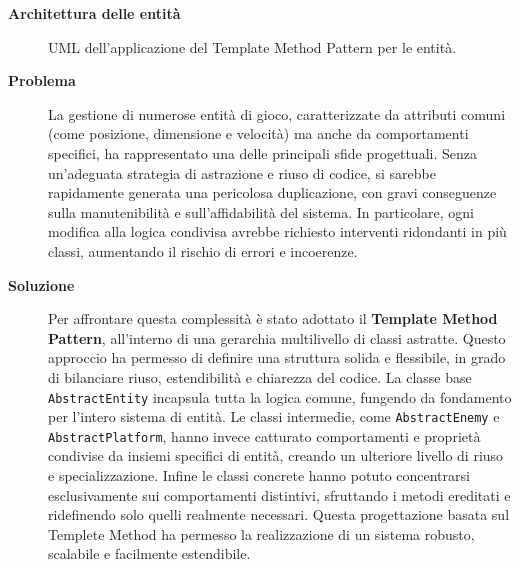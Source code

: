 \documentclass[a4paper,12pt]{report}
\begin{document}
\noindent
\textbf{Architettura delle entità}
\begin{figure}[H]
	\centering{}
	
	\caption{UML dell'applicazione del Template Method Pattern per le entità.}
	\label{img:AbstractEntity}
\end{figure}
\begin{description}
	\item[\textbf{Problema}]
	      La gestione di numerose entità di gioco, caratterizzate da attributi comuni (come posizione, dimensione e velocità) ma anche da comportamenti specifici, ha rappresentato una delle
		  principali sfide progettuali. Senza un'adeguata strategia di astrazione e riuso di codice, si sarebbe rapidamente generata una pericolosa duplicazione, con gravi conseguenze sulla manutenibilità
		  e sull'affidabilità del sistema. In particolare, ogni modifica alla logica condivisa avrebbe richiesto interventi ridondanti in più classi, aumentando il rischio di errori e incoerenze.

	\item[\textbf{Soluzione}]
	      Per affrontare questa complessità è stato adottato il \textbf{Template Method Pattern}, all'interno di una gerarchia multilivello di classi astratte. Questo approccio ha permesso di definire una struttura
		  solida e flessibile, in grado di bilanciare riuso, estendibilità e chiarezza del codice.
		  La classe base \texttt{AbstractEntity} incapsula tutta la logica comune, fungendo da fondamento per l'intero sistema di entità. Le classi intermedie, come \texttt{AbstractEnemy} e \texttt{AbstractPlatform},
		  hanno invece catturato comportamenti e proprietà condivise da insiemi specifici di entità, creando un ulteriore livello di riuso e specializzazione.
		  Infine le classi concrete hanno potuto concentrarsi esclusivamente sui comportamenti distintivi, sfruttando i metodi ereditati e ridefinendo solo quelli realmente necessari.
		  Questa progettazione basata sul Templete Method ha permesso la realizzazione di un sistema robusto, scalabile e facilmente estendibile.
\end{description}
\end{document}
